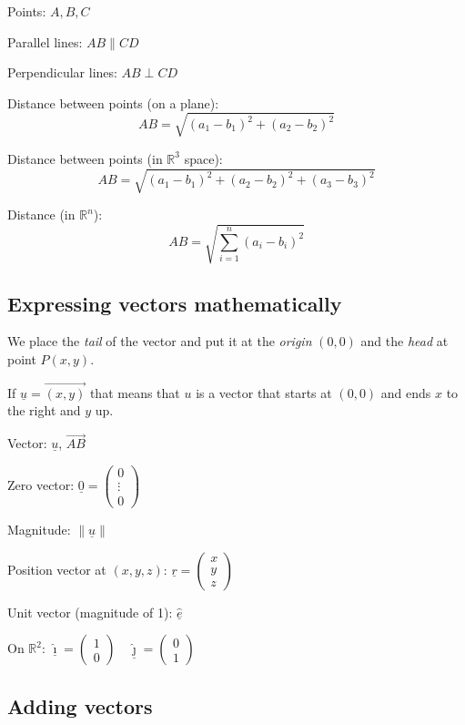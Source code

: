 \documentclass[00_complete]{subfiles}
\begin{document}
Points: $A,B,C$

Parallel lines: $AB \parallel CD$

Perpendicular lines: $AB \perp CD$

Distance between points (on a plane):
$$AB = \sqrt{(a_1-b_1)^2+(a_2-b_2)^2}$$

Distance between points (in $\mathbb{R}^3$ space):
$$AB = \sqrt{(a_1-b_1)^2+(a_2-b_2)^2+(a_3-b_3)^2}$$

Distance (in $\mathbb{R}^n$):
$$AB= \sqrt{\displaystyle\sum_{i=1}^n(a_i-b_i)^2}$$

\subsection{Expressing vectors mathematically}

We place the \emph{tail} of the vector and put it at the \emph{origin} $(0,0)$ and the
\emph{head} at point $P(x,y)$.

If $\underline u = \vec{(x,y)}$ that means that $u$ is a vector that starts at $(0,0)$ and ends $x$ to the right and $y$ up.

\begin{symbols}
Vector: $\underline u$, $\vec{AB}$

Zero vector: $\underline 0 = \begin{pmatrix}
    0 \\
    \vdots \\
    0
\end{pmatrix}$

Magnitude: $\|\underline u\|$

Position vector at $(x,y,z)$: $\underline r =
\begin{pmatrix}
    x \\y\\z
\end{pmatrix}$

Unit vector (magnitude of 1): $\underline{\hat e}$

On $\mathbb{R}^2$: $\underline{\hat \imath} = \begin{pmatrix}
    1\\0
\end{pmatrix}
\quad
\underline{\hat \jmath} = \begin{pmatrix}
    0\\1
\end{pmatrix}$
\end{symbols}

\subsection{Adding vectors}
\end{document}
